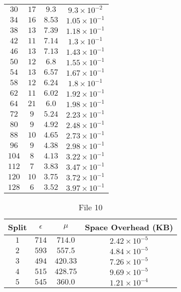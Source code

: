 \begin{center}
\begin{table}
\begin{center}
\begin{tabular}{c | c | c | c }
			$30$ & $17$ & $9.3$ & $9.3\times 10^{-2}$ \\ 
			$34$ & $16$ & $8.53$ & $1.05\times 10^{-1}$ \\ 
			$38$ & $13$ & $7.39$ & $1.18\times 10^{-1}$ \\ 
			$42$ & $11$ & $7.14$ & $1.3\times 10^{-1}$ \\ 
			$46$ & $13$ & $7.13$ & $1.43\times 10^{-1}$ \\ 
			$50$ & $12$ & $6.8$ & $1.55\times 10^{-1}$ \\ 
			$54$ & $13$ & $6.57$ & $1.67\times 10^{-1}$ \\ 
			$58$ & $12$ & $6.24$ & $1.8\times 10^{-1}$ \\ 
			$62$ & $11$ & $6.02$ & $1.92\times 10^{-1}$ \\ 
			$64$ & $21$ & $6.0$ & $1.98\times 10^{-1}$ \\ 
			$72$ & $9$ & $5.24$ & $2.23\times 10^{-1}$ \\ 
			$80$ & $9$ & $4.92$ & $2.48\times 10^{-1}$ \\ 
			$88$ & $10$ & $4.65$ & $2.73\times 10^{-1}$ \\ 
			$96$ & $9$ & $4.38$ & $2.98\times 10^{-1}$ \\ 
			$104$ & $8$ & $4.13$ & $3.22\times 10^{-1}$ \\ 
			$112$ & $7$ & $3.83$ & $3.47\times 10^{-1}$ \\ 
			$120$ & $10$ & $3.75$ & $3.72\times 10^{-1}$ \\ 
			$128$ & $6$ & $3.52$ & $3.97\times 10^{-1}$ \\  
			\hline  
		\end{tabular}
		\end{center}
	\end{table}
	\vspace*{0.5 cm}
	\begin{table}
	\begin{center}
	\caption{File 10}\label{tab:n3}
	\begin{tabular}{c | c | c | c }	
		\hline
		Split & $\epsilon$ & $\mu$ & Space Overhead (KB) \\ \hline
		\hline
		$1$ & $714$ & $714.0$ & $2.42\times 10^{-5}$ \\ 
		$2$ & $593$ & $557.5$ & $4.84\times 10^{-5}$ \\ 
		$3$ & $494$ & $420.33$ & $7.26\times 10^{-5}$ \\ 
		$4$ & $515$ & $428.75$ & $9.69\times 10^{-5}$ \\ 
		$5$ & $545$ & $360.0$ & $1.21\times 10^{-4}$ \\ 

\end{tabular}
\end{center}
\end{table}
\end{center}
